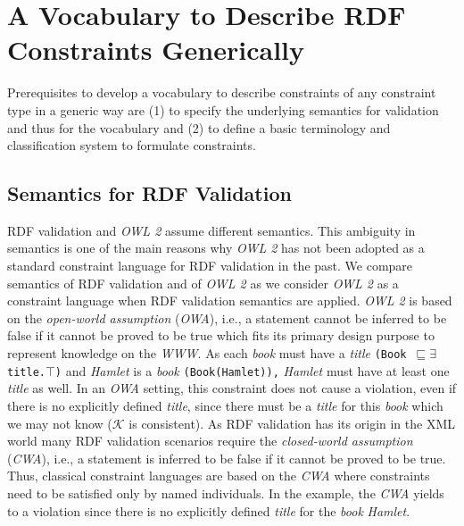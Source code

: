 \documentclass[a4paper,fontsize=11pt]{scrartcl}
\newcommand{\ms}[1]{\texttt{#1}}
\begin{document}
\section{A Vocabulary to Describe RDF Constraints Generically} 
\label{sec:vocabulary}

Prerequisites to develop a vocabulary to describe constraints of any constraint type in a generic way are 
(1) to specify the underlying semantics for validation and thus for the vocabulary and (2) to define a basic terminology and classification system to formulate constraints.

\subsection{Semantics for RDF Validation}

RDF validation and \emph{OWL 2} assume different semantics. 
This ambiguity in semantics is one of the main reasons why \emph{OWL 2} has not been adopted as a standard constraint language for RDF validation in the past.
We compare semantics of RDF validation and of \emph{OWL 2} as we consider \emph{OWL 2} as a constraint language 
when RDF validation semantics are applied.
%
\emph{OWL 2} is based on the {\em open-world assumption} (\emph{OWA}), i.e., a statement cannot be inferred to be false if it cannot be proved to be true  which fits its primary design purpose to represent knowledge on the \emph{WWW}. 
As each \emph{book} must have a \emph{title} {\small\ms{(Book $\sqsubseteq \exists$ title.$\top$)}} and {\em Hamlet} is a \emph{book} {\small\ms{(Book(Hamlet)),}}
{\em Hamlet} must have at least one \emph{title} as well.
In an \emph{OWA} setting, this constraint does not cause a violation, even if there is no explicitly defined \emph{title}, since there must be a \emph{title} for this \emph{book} which we may not know ($\mathcal{K}$ is consistent).
As RDF validation has its origin in the XML world
many RDF validation scenarios require the {\em closed-world assumption} (\emph{CWA}), i.e., a statement is inferred to be false if it cannot be proved to be true.
Thus, classical constraint languages are based on the \emph{CWA} where constraints need to be satisfied only by named individuals. 
In the example, the \emph{CWA} yields to a violation since there is no explicitly defined \emph{title} for the \emph{book} {\em Hamlet}. 
\end{document}
